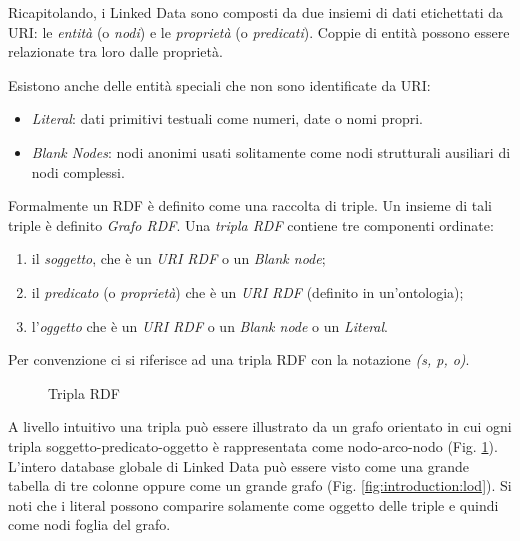 Ricapitolando, i Linked Data sono composti da due insiemi di dati etichettati da URI: le \textit{entità} (o \textit{nodi}) e le \textit{proprietà} (o \textit{predicati}). Coppie di entità possono essere relazionate tra loro dalle proprietà. 

Esistono anche delle entità speciali che non sono identificate da 
URI: \nolinebreak
\begin{itemize}
\item \textit{Literal}: dati primitivi testuali come numeri, date o nomi propri.
\item \textit{Blank Nodes}: nodi anonimi usati solitamente come nodi strutturali ausiliari di nodi complessi.
\end{itemize}

Formalmente \cite{RDF_DEFINITION} un RDF è definito come una raccolta di triple. Un insieme di tali triple è definito \textit{Grafo RDF}. 
Una \textit{tripla RDF} contiene tre componenti ordinate:
\begin{enumerate}
\item il \textit{soggetto}, che è un \textit{URI RDF} o un \textit{Blank node};
\item il \textit{predicato} (o \textit{proprietà}) che è un \textit{URI RDF} (definito in un'ontologia);
\item l'\textit{oggetto} che è un \textit{URI RDF} o un \textit{Blank node} o un \textit{Literal}.
\end{enumerate}
Per convenzione ci si riferisce ad una tripla RDF con la notazione \textit{(s, p, o)}.
\begin{figure}[htb]
	\caption{Tripla RDF}
	\label{fig:introduction:rdf_triple}
\end{figure}



A livello intuitivo una tripla può essere illustrato da un grafo orientato in cui ogni tripla soggetto-predicato-oggetto è rappresentata come nodo-arco-nodo  (Fig. \ref{fig:introduction:rdf_triple}). L'intero database globale di Linked Data può essere visto come una grande tabella di tre colonne oppure come un grande grafo (Fig. \ref{fig:introduction:lod}).
Si noti che i literal possono comparire solamente come oggetto delle triple e quindi come nodi foglia del grafo.

